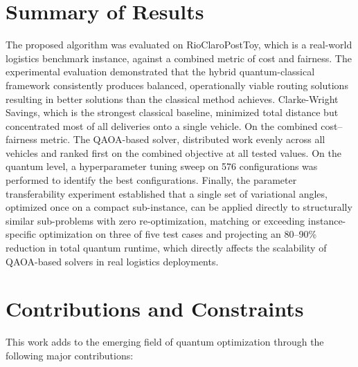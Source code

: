 \documentclass[a4paper]{report}
\begin{document}
{\begin{itemize}
\begin{itemize}


\section{Summary of Results}
The proposed algorithm was evaluated on RioClaroPostToy, which is a real-world logistics benchmark instance, against a combined metric of cost and fairness. 
The experimental evaluation demonstrated that the hybrid quantum-classical framework consistently produces balanced, operationally viable routing solutions resulting in better solutions than the classical method achieves. Clarke-Wright Savings, which is the strongest classical baseline, minimized total distance but concentrated most of all deliveries onto a single vehicle. On the combined cost–fairness metric. The QAOA-based solver, distributed work evenly across all vehicles and ranked first on the combined objective at all tested values. On the quantum level, a hyperparameter tuning sweep on 576 configurations was performed to identify the best configurations. Finally, the parameter transferability experiment established that a single set of variational angles, optimized once on a compact sub-instance, can be applied directly to structurally similar sub-problems with zero re-optimization, matching or exceeding instance-specific optimization on three of five test cases and projecting an 80–90\% reduction in total quantum runtime, which directly affects the scalability of QAOA-based solvers in real logistics deployments.


\section{Contributions and Constraints}
This work adds to the emerging field of quantum optimization through the following major contributions:


\end{itemize}
\end{itemize}}
\end{document}
